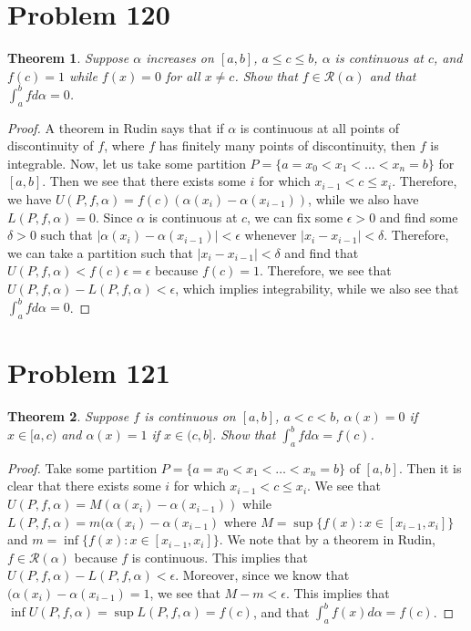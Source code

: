 \documentclass[psamsfonts]{amsart}
\newtheorem{thm}{Theorem}[section]
\theoremstyle{definition}
\theoremstyle{remark}
\numberwithin{equation}{section}
\begin{document}
\section{Problem 120}

\begin{thm}
Suppose $\alpha$ increases on $[a,b]$, $a \leq c \leq b$, $\alpha$ is continuous at $c$, and $f(c) = 1$ while $f(x) = 0$ for all $x \neq c$. Show that $f \in \mathscr{R}(\alpha)$ and that $\int_a^b f d\alpha = 0$. 
\end{thm}

\begin{proof}
A theorem in Rudin says that if $\alpha$ is continuous at all points of discontinuity of $f$, where $f$ has finitely many points of discontinuity, then $f$ is integrable. Now, let us take some partition $P = \{ a = x_0 < x_1 < \ldots < x_n = b \}$ for $[a,b]$. Then we see that there exists some $i$ for which $x_{i-1} < c \leq x_i$. Therefore, we have $U(P,f,\alpha) = f(c) (\alpha(x_i) - \alpha(x_{i-1}))$, while we also have $L(P,f, \alpha) = 0$. Since $\alpha$ is continuous at $c$, we can fix some $\epsilon > 0$ and find some $\delta > 0$ such that $|\alpha(x_i) - \alpha(x_{i-1})| < \epsilon$ whenever $|x_i - x_{i-1} | < \delta$. Therefore, we can take a partition such that $|x_i - x_{i-1}| < \delta$ and find that $U(P,f,\alpha) < f(c) \epsilon = \epsilon$ because $f(c) = 1$. Therefore, we see that $U(P,f, \alpha) - L(P,f,\alpha) < \epsilon$, which implies integrability, while we also see that $\int_a^b f d \alpha = 0$. 
\end{proof}

\section{Problem 121}

\begin{thm}
Suppose $f$ is continuous on $[a,b]$, $a<c<b$, $\alpha(x) = 0$ if $x \in [a,c)$ and $\alpha(x) = 1$ if $x \in (c,b]$. Show that $\int_a^b f d \alpha = f(c)$. 
\end{thm}

\begin{proof}
Take some partition $P = \{ a = x_0 < x_1 < \ldots < x_n = b \}$ of $[a,b]$. Then it is clear that there exists some $i$ for which $x_{i-1} < c \leq x_i$. We see that $U(P,f,\alpha) = M (\alpha(x_i) - \alpha(x_{i-1}))$ while $L(P,f,\alpha) = m (\alpha(x_i) - \alpha(x_{i-1})$ where $ M = \sup \{ f(x): x \in [x_{i-1},x_i] \}$ and $m = \inf \{ f(x): x \in [x_{i-1}, x_i ] \}$. We note that by a theorem in Rudin, $f \in \mathscr{R}(\alpha)$ because $f$ is continuous. This implies that $U(P,f,\alpha) - L(P,f,\alpha) < \epsilon$. Moreover, since we know that $(\alpha(x_i) - \alpha(x_{i-1}) = 1$, we see that $M - m < \epsilon$. This implies that $\inf U(P,f,\alpha) = \sup L(P,f, \alpha) = f(c)$, and that $\int_a^b f(x) d\alpha = f(c)$. 
\end{proof}
\end{document}
